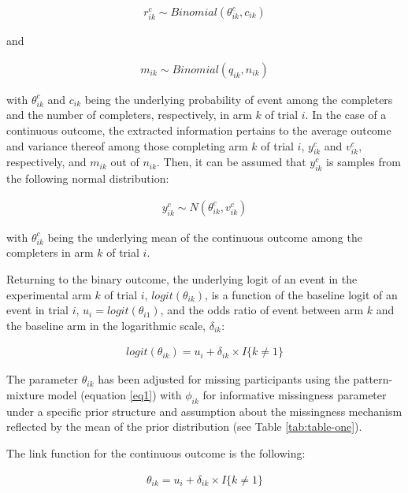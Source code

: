 \[\begin{aligned}
r^{c}_{ik} \sim Binomial(\theta^{c}_{ik}, c_{ik})  
\end{aligned}\]

and

\[\begin{aligned}
m_{ik} \sim Binomial(q_{ik}, n_{ik})  
\end{aligned}\]

with \(\theta^{c}_{ik}\) and \(c_{ik}\) being the underlying probability of event
among the completers and the number of completers, respectively, in arm \(k\) of
trial \(i\). In the case of a continuous outcome, the extracted information pertains
to the average outcome and variance thereof among those completing arm \(k\) of trial
\(i\), \(y^{c}_{ik}\) and \(v^{c}_{ik}\), respectively, and \(m_{ik}\) out of \(n_{ik}\).
Then, it can be assumed that \(y^{c}_{ik}\) is samples from the following normal
distribution:

\[\begin{aligned}
y^{c}_{ik} \sim N(\theta^{c}_{ik}, v^{c}_{ik})  
\end{aligned}\]

with \(\theta^{c}_{ik}\) being the underlying mean of the continuous outcome among
the completers in arm \(k\) of trial \(i\).

Returning to the binary outcome, the underlying logit of an event in the experimental
arm \(k\) of trial \(i\), \(logit(\theta_{ik})\), is a function of the baseline logit of
an event in trial \(i\), \(u_{i} = logit(\theta_{i1})\),
and the odds ratio of event between arm \(k\) and the baseline arm in the logarithmic
scale, \(\delta_{ik}\):

\[\begin{aligned}
logit(\theta_{ik}) = u_{i} + \delta_{ik} \times I\{k \ne 1\}   
\end{aligned}\]

The parameter \(\theta_{ik}\) has been adjusted for missing participants using the
pattern-mixture model (equation \ref{eq1}) with \(\phi_{ik}\) for informative
missingness parameter under a specific prior structure and assumption about the
missingness mechanism reflected by the mean of the prior distribution (see Table
\ref{tab:table-one}).

The link function for the continuous outcome is the following:

\[\begin{aligned}
\theta_{ik} = u_{i} + \delta_{ik} \times I\{k \ne 1\}      
\end{aligned}\]

